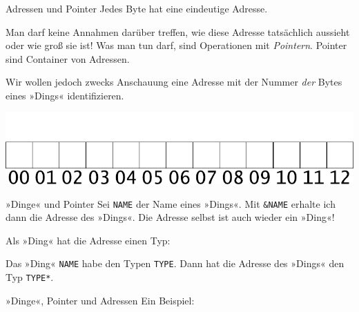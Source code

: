 \begin{frame}[fragile]{Adressen und Pointer}
	Jedes Byte hat eine eindeutige Adresse.
	
	Man darf keine Annahmen darüber treffen, wie diese Adresse tatsächlich aussieht oder wie groß sie ist!
	Was man tun darf, sind Operationen mit \emph{Pointern}. Pointer sind Container von Adressen.
	
	\pause
	\vspace{1em}
	
	Wir wollen jedoch zwecks Anschauung eine Adresse mit der Nummer \emph{der} Bytes eines »Dings« identifizieren.
	
	\includegraphics[width=\linewidth]{images/free}
\end{frame}

\begin{frame}[fragile]{»Dinge« und Pointer}
	Sei \verb|NAME| der Name eines »Dings«. Mit \verb|&NAME| erhalte ich dann die Adresse des »Dings«. Die Adresse selbst ist auch wieder ein »Ding«!
	
	\vspace{1em}
	\pause
	
	Als »Ding« hat die Adresse einen Typ:
	{\footnotesize
	\begin{block}{}
		
	\end{block}
	}
	
	\pause
	
	Das »Ding« \verb|NAME| habe den Typen \verb|TYPE|. Dann hat die Adresse des »Dings« den Typ \verb|TYPE*|.
\end{frame}


\begin{frame}[fragile]{»Dinge«, Pointer und Adressen}
	Ein Beispiel:
	
	{\footnotesize
	\begin{block}{}
		
	\end{block}
	}
	
	\vspace{1em}
\end{frame}

